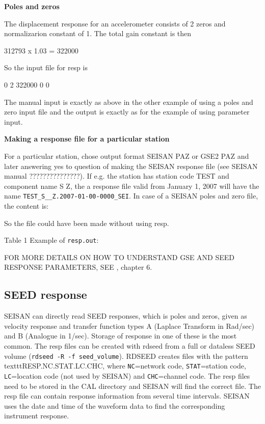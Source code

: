 \textbf{Poles and zeros}

The displacement response for an accelerometer consists of 2 zeros 
and normalizarion constant of 1. The total gain constant is then 

312793 x 1.03 = 322000 

So the input file for resp is 

0 2 322000 0  0 

The manual input is exactly as above in the other example of using a poles and zero input file and the output is exactly as for the example of using parameter input. 

\textbf{Making a response file for a particular station}

For a particular station, chose output format SEISAN PAZ or GSE2 PAZ 
and later answering yes to question of making the SEISAN response 
file (see SEISAN manual ???????????????). 
If e.g. the station has station code TEST and component name S Z, 
the a response file valid from January 1, 2007 will have the name 
\texttt{TEST\_S\_\_Z.2007-01-00-0000\_SEI}. 
In case of a SEISAN poles and zero file, the content is:  



So the file could have been made without using resp. 

Table 1 Example of \texttt{resp.out}: 



FOR MORE DETAILS ON HOW TO UNDERSTAND GSE AND SEED RESPONSE PARAMETERS, 
SEE \citep{havskov2004}, chapter 6. 

\subsection{SEED response} 


SEISAN can directly read SEED responses, which is poles and zeros, 
given as velocity response and transfer function types A (Laplace 
Transform in Rad/sec) and B (Analogue in 1/sec). Storage of response 
in one of these is the most common. The resp files can be created 
with rdseed from a full or dataless SEED volume 
(\texttt{rdseed -R -f seed\_volume}). RDSEED creates files with the 
pattern texttt{RESP.NC.STAT.LC.CHC}, where \texttt{NC}=network code, \texttt{STAT}=station code, 
\texttt{LC}=location code (not used by SEISAN) and \texttt{CHC}=channel code. The resp 
files need to be stored in the CAL directory and SEISAN will find 
the correct file. The resp file can contain response information from 
several time intervals. SEISAN uses the date and time of the waveform 
data to find the corresponding instrument response. 

